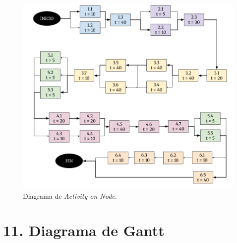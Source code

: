 \documentclass[
11pt, %
]{charter}
\begin{document}
\begin{figure}[htpb]
\centering 
\includegraphics[width=.85\textwidth]{./Figuras/Diagrama-AoN.png}
\caption{Diagrama de \textit{Activity on Node}.}
\label{fig:AoN}
\end{figure}


\section{11. Diagrama de Gantt}
\label{sec:gantt}
\end{document}
